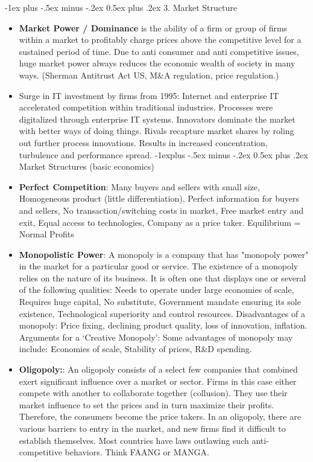 \documentclass[12pt, landscape]{article}
\makeatletter
\renewcommand{\section}{\@startsection{section}{1}{0mm}%
                                {-1ex plus -.5ex minus -.2ex}%
                                {0.5ex plus .2ex}%
                                {\normalfont\large\bfseries}}
\renewcommand{\subsection}{\@startsection{subsection}{2}{0mm}%
                                {-1explus -.5ex minus -.2ex}%
                                {0.5ex plus .2ex}%
                                {\normalfont\normalsize\bfseries}}
\makeatother
\begin{document}
\begin{multicols*}{3}
\vfill\null
\columnbreak

\section{3. Market Structure}
\begin{itemize}
\item \textbf{Market Power / Dominance} is the ability of a firm or group of firms within a market to profitably charge prices above the competitive level for a sustained period of time. Due to anti consumer and anti competitive issues, huge market power always reduces the economic wealth of society in many ways. (Sherman Antitrust Act US, M\&A regulation, price regulation.)
\item Surge in IT investment by firms from 1995: Internet and enterprise IT accelerated competition within traditional industries. Processes were digitalized through enterprise IT systems. Innovators dominate the market with better ways of doing things. Rivals recapture market shares by roling out further process innovations. Results in increased concentration, turbulence and performance spread.
\subsection{Market Structures (basic economics)}
\item \textbf{Perfect Competition}: Many buyers and sellers with small size, Homogeneous product (little differentiation), Perfect information for buyers and sellers, No transaction/switching costs in market, Free market entry and exit, Equal access to technologies, Company as a price taker. Equilibrium = Normal Profits
\item \textbf{Monopolistic Power}: A monopoly is a company that has "monopoly power" in the market for a particular good or service. The existence of a monopoly relies on the nature of its business. It is often one that displays one or several of the following qualities: Needs to operate under large economies of scale, Requires huge capital, No substitute, Government mandate ensuring its sole existence, Technological superiority and control resources. Disadvantages of a monopoly: Price fixing, declining product quality, loss of innovation, inflation.
\\ Arguments for a `Creative Monopoly': Some advantages of monopoly may include: Economies of scale, Stability of prices, R\&D spending.
\item \textbf{Oligopoly:}: An oligopoly consists of a select few companies that combined exert significant influence over a market or sector. Firms in this case either compete with another to collaborate together (collusion). They use their market influence to set the prices and in turn maximize their profits. Therefore, the consumers become the price takers. In an oligopoly, there are various barriers to entry in the market, and new firms find it difficult to establish themselves. Most countries have laws outlawing such anti-competitive behaviors. Think FAANG or MANGA.
\end{itemize}



\end{multicols*}
\end{document}
